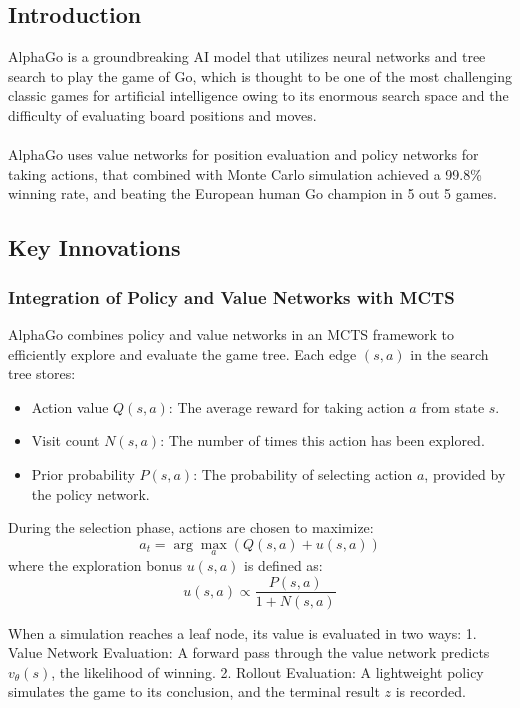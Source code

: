 \subsection{Introduction}
AlphaGo is a groundbreaking AI model that utilizes neural networks and tree search to play the game of Go, which is thought to be one of the most challenging classic games for artificial intelligence owing to its enormous search space and the difficulty of evaluating board positions and moves.
\\\\
AlphaGo uses value networks for position evaluation and policy networks for taking actions, that combined with Monte Carlo simulation achieved a 99.8\% winning rate, and beating the European human Go champion in 5 out 5 games.
\subsection{Key Innovations}

\subsubsection*{Integration of Policy and Value Networks with MCTS}
AlphaGo combines policy and value networks in an MCTS framework to efficiently explore and evaluate the game tree. Each edge \( (s, a) \) in the search tree stores:
\begin{itemize}
    \item Action value \( Q(s, a) \): The average reward for taking action \( a \) from state \( s \).
    \item Visit count \( N(s, a) \): The number of times this action has been explored.
    \item Prior probability \( P(s, a) \): The probability of selecting action \( a \), provided by the policy network.
\end{itemize}

During the selection phase, actions are chosen to maximize:
\[
a_t = \arg\max_a \left( Q(s, a) + u(s, a) \right)
\]
where the exploration bonus \( u(s, a) \) is defined as:
\[
u(s, a) \propto \frac{P(s, a)}{1 + N(s, a)}
\]

When a simulation reaches a leaf node, its value is evaluated in two ways:
1. Value Network Evaluation: A forward pass through the value network predicts \( v_\theta(s) \), the likelihood of winning.
2. Rollout Evaluation: A lightweight policy simulates the game to its conclusion, and the terminal result \( z \) is recorded.

